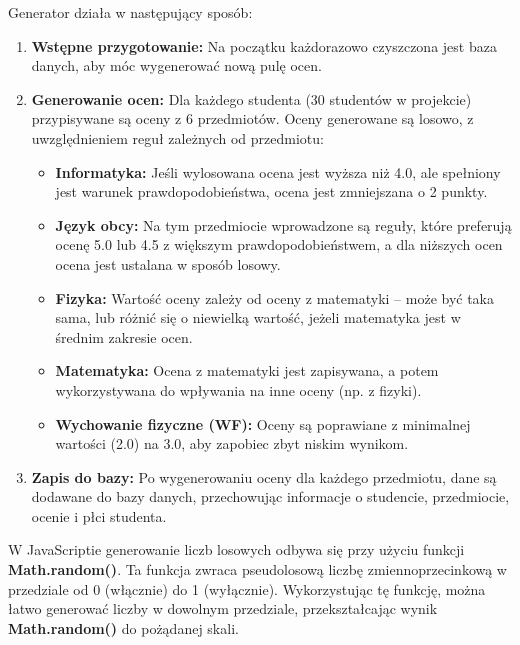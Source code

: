 Generator działa w następujący sposób:
\begin{enumerate}
	\item \textbf{Wstępne przygotowanie:} Na początku każdorazowo czyszczona jest baza danych, aby móc wygenerować nową pulę ocen.
	\item \textbf{Generowanie ocen:} Dla każdego studenta (30 studentów w projekcie) przypisywane są oceny z 6 przedmiotów. Oceny generowane są losowo, z uwzględnieniem reguł zależnych od przedmiotu:
	\begin{itemize}
		\item \textbf{Informatyka:} Jeśli wylosowana ocena jest wyższa niż 4.0, ale spełniony jest warunek prawdopodobieństwa, ocena jest zmniejszana o 2 punkty.
		\item \textbf{Język obcy:} Na tym przedmiocie wprowadzone są reguły, które preferują ocenę 5.0 lub 4.5 z większym prawdopodobieństwem, a dla niższych ocen ocena jest ustalana w sposób losowy.
		\item \textbf{Fizyka:} Wartość oceny zależy od oceny z matematyki – może być taka sama, lub różnić się o niewielką wartość, jeżeli matematyka jest w średnim zakresie ocen.
		\item \textbf{Matematyka:} Ocena z matematyki jest zapisywana, a potem wykorzystywana do wpływania na inne oceny (np. z fizyki).
		\item \textbf{Wychowanie fizyczne (WF):} Oceny są poprawiane z minimalnej wartości (2.0) na 3.0, aby zapobiec zbyt niskim wynikom.
	\end{itemize}
	\item \textbf{Zapis do bazy:} Po wygenerowaniu oceny dla każdego przedmiotu, dane są dodawane do bazy danych, przechowując informacje o studencie, przedmiocie, ocenie i płci studenta.
\end{enumerate}


W JavaScriptie generowanie liczb losowych odbywa się przy użyciu funkcji \\ \textbf{Math.random()}. Ta funkcja zwraca pseudolosową liczbę zmiennoprzecinkową w przedziale od 0 (włącznie) do 1 (wyłącznie). Wykorzystując tę funkcję, można łatwo generować liczby w dowolnym przedziale, przekształcając wynik \textbf{Math.random()} do pożądanej skali.

